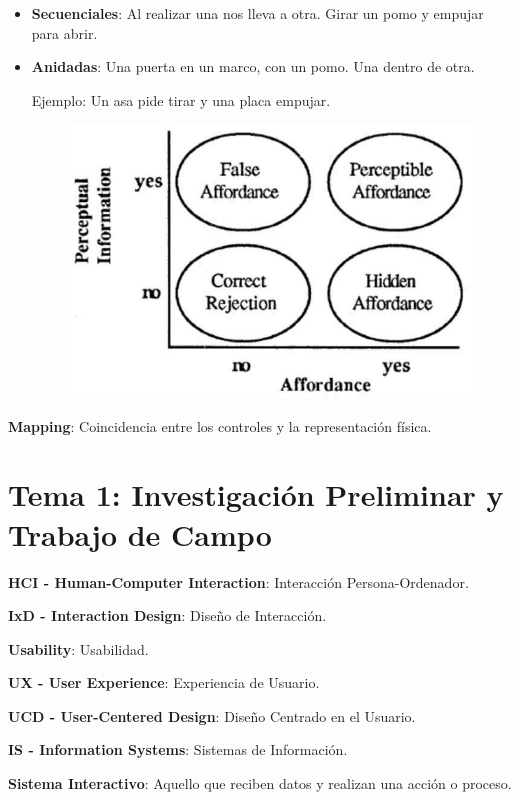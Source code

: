 \documentclass[12pt, twoside, openright]{report} %
\begin{document}
\begin{itemize}
\item
  \textbf{Secuenciales}: Al realizar una nos lleva a otra. Girar un pomo
  y empujar para abrir.
\item
  \textbf{Anidadas}: Una puerta en un marco, con un pomo. Una dentro de
  otra.

  Ejemplo: Un asa pide tirar y una placa empujar.
  \begin{figure}[H]
	{\includegraphics[scale=.4]{Untitled.png}}
\end{figure}
\end{itemize}

\textbf{Mapping}: Coincidencia entre los controles y la representación
física.

\chapter{Tema 1: Investigación Preliminar y Trabajo de Campo}

\textbf{HCI - Human-Computer Interaction}: Interacción
Persona-Ordenador.

\textbf{IxD - Interaction Design}: Diseño de Interacción.

\textbf{Usability}: Usabilidad.

\textbf{UX - User Experience}: Experiencia de Usuario.

\textbf{UCD - User-Centered Design}: Diseño Centrado en el Usuario.

\textbf{IS - Information Systems}: Sistemas de Información.

\textbf{Sistema Interactivo}: Aquello que reciben datos y realizan una
acción o proceso.
\end{document}

